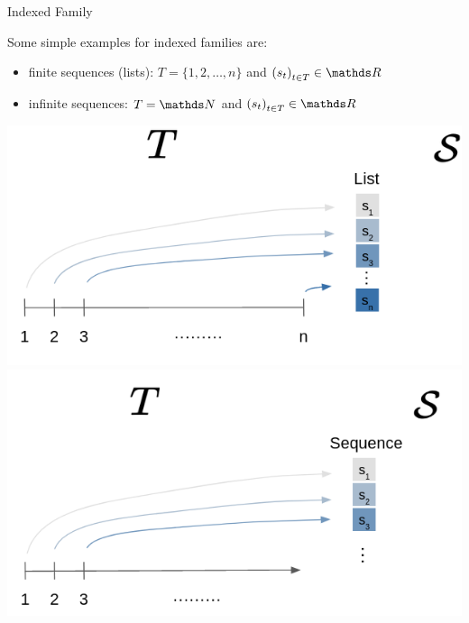 \begin{vbframe}{Indexed Family}

Some simple examples for indexed families are:

\vspace*{0.3cm}

\begin{minipage}{0.43\linewidth}
  \begin{itemize}
  \item finite sequences (lists): $T = \{1, 2, \dots, n\}$ and $\left(s_t\right)_{t \in T} \in \R$ \vspace{1cm}
  \item infinite sequences: $T = \N$ and $\left(s_t\right)_{t \in T} \in \R$
  \end{itemize}
\end{minipage}
\begin{minipage}{0.55\linewidth}
\includegraphics{figure_man/indexed_family/indexed_family_1.png} \\
\includegraphics{figure_man/indexed_family/indexed_family_2.png}
\end{minipage}


\framebreak


\end{vbframe}
